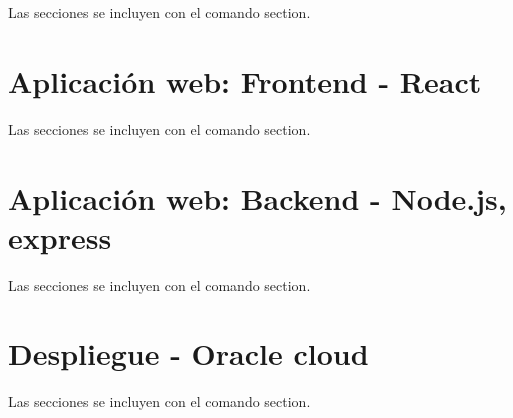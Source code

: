 Las secciones se incluyen con el comando section.

\section{Aplicación web: Frontend - React}

Las secciones se incluyen con el comando section.

\section{Aplicación web: Backend - Node.js, express}

Las secciones se incluyen con el comando section.

\section{Despliegue - Oracle cloud}

Las secciones se incluyen con el comando section.
